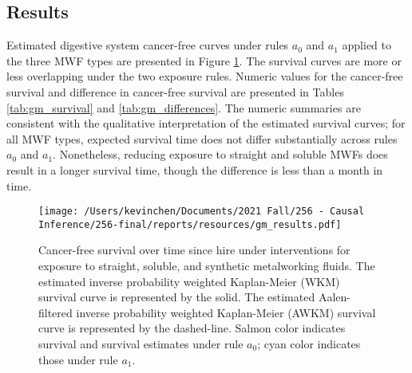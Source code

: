 \documentclass[
  11pt,
]{article}
\begin{document}
\hypertarget{results-1}{%
\subsection{Results}\label{results-1}}

Estimated digestive system cancer-free curves under rules \(a_0\) and
\(a_1\) applied to the three MWF types are presented in Figure
\ref{fig:gm_survival}. The survival curves are more or less overlapping
under the two exposure rules. Numeric values for the cancer-free
survival and difference in cancer-free survival are presented in Tables
\ref{tab:gm_survival} and \ref{tab:gm_differences}. The numeric
summaries are consistent with the qualitative interpretation of the
estimated survival curves; for all MWF types, expected survival time
does not differ substantially across rules \(a_0\) and \(a_1\).
Nonetheless, reducing exposure to straight and soluble MWFs does result
in a longer survival time, though the difference is less than a month in
time.

\begin{figure}[h]
\caption{Cancer-free survival over time since hire under interventions for exposure to straight, soluble, and synthetic metalworking fluids. The estimated inverse probability weighted Kaplan-Meier (WKM) survival curve is represented by the solid. The estimated Aalen-filtered inverse probability weighted Kaplan-Meier (AWKM) survival curve is represented by the dashed-line. Salmon color indicates survival and survival estimates under rule $a_0$; cyan color indicates those under rule $a_1$.}
\label{fig:gm_survival}
\begin{center}
\texttt{[image: /Users/kevinchen/Documents/2021 Fall/256 - Causal Inference/256-final/reports/resources/gm\_results.pdf]}
\end{center}
\end{figure}
\end{document}
